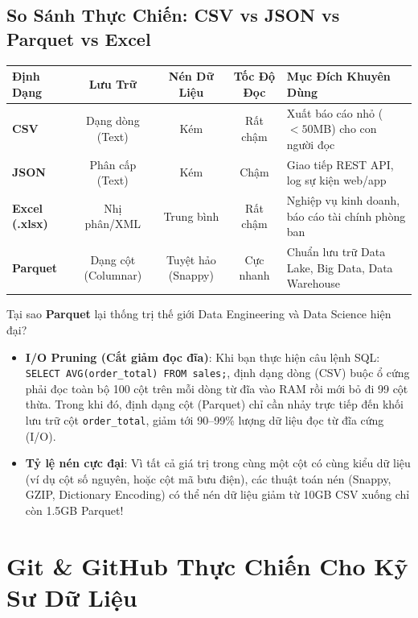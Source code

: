 \subsection{So Sánh Thực Chiến: CSV vs JSON vs Parquet vs Excel}

\begin{center}
\begin{tabular}{|l|c|c|c|p{4.5cm}|}
\hline
\textbf{Định Dạng} & \textbf{Lưu Trữ} & \textbf{Nén Dữ Liệu} & \textbf{Tốc Độ Đọc} & \textbf{Mục Đích Khuyên Dùng} \\
\hline
\textbf{CSV} & Dạng dòng (Text) & Kém & Rất chậm & Xuất báo cáo nhỏ ($<50$MB) cho con người đọc \\
\hline
\textbf{JSON} & Phân cấp (Text) & Kém & Chậm & Giao tiếp REST API, log sự kiện web/app \\
\hline
\textbf{Excel (.xlsx)} & Nhị phân/XML & Trung bình & Rất chậm & Nghiệp vụ kinh doanh, báo cáo tài chính phòng ban \\
\hline
\textbf{Parquet} & Dạng cột (Columnar) & Tuyệt hảo (Snappy) & Cực nhanh & Chuẩn lưu trữ Data Lake, Big Data, Data Warehouse \\
\hline
\end{tabular}
\end{center}

\begin{lythuyetbox}
Tại sao \textbf{Parquet} lại thống trị thế giới Data Engineering và Data Science hiện đại?
\begin{itemize}
    \item \textbf{I/O Pruning (Cắt giảm đọc đĩa)}: Khi bạn thực hiện câu lệnh SQL: \texttt{SELECT AVG(order\_total) FROM sales;}, định dạng dòng (CSV) buộc ổ cứng phải đọc toàn bộ 100 cột trên mỗi dòng từ đĩa vào RAM rồi mới bỏ đi 99 cột thừa. Trong khi đó, định dạng cột (Parquet) chỉ cần nhảy trực tiếp đến khối lưu trữ cột \texttt{order\_total}, giảm tới 90--99\% lượng dữ liệu đọc từ đĩa cứng (I/O).
    \item \textbf{Tỷ lệ nén cực đại}: Vì tất cả giá trị trong cùng một cột có cùng kiểu dữ liệu (ví dụ cột số nguyên, hoặc cột mã bưu điện), các thuật toán nén (Snappy, GZIP, Dictionary Encoding) có thể nén dữ liệu giảm từ 10GB CSV xuống chỉ còn 1.5GB Parquet!
\end{itemize}
\end{lythuyetbox}

\section{Git \& GitHub Thực Chiến Cho Kỹ Sư Dữ Liệu}

